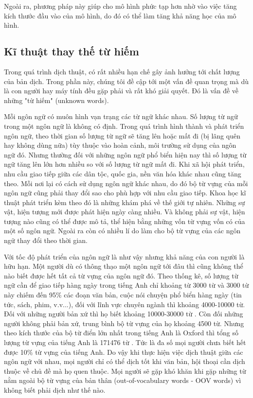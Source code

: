 Ngoài ra, phương pháp này giúp cho mô hình phức tạp hơn nhờ vào việc tăng kích thước đầu vào của mô hình, do đó có thể làm tăng khả năng học của mô hình.

\subsection{Kĩ thuật thay thế từ hiếm}
Trong quá trình dịch thuật, có rất nhiều hạn chế gây ảnh hưởng tới chất lượng của bản dịch. Trong phần này, chúng tôi đề cập tới một vấn đề quan trọng mà dù là con người hay máy tính đều gặp phải và rất khó giải quyết. Đó là vấn đề về những "từ hiếm" (unknown words). 

Mỗi ngôn ngữ có muôn hình vạn trạng các từ ngữ khác nhau. Số lượng từ ngữ trong một ngôn ngữ là không có định. Trong quá trình hình thành và phát triển ngôn ngữ, theo thời gian số lượng từ ngữ sẽ tăng lên hoặc mất đi (bị lãng quên hay không dùng nữa) tùy thuộc vào hoàn cảnh, môi trường sử dụng của ngôn ngữ đó. Nhưng thường đối với những ngôn ngữ phổ biển hiện nay thì số lượng từ ngữ tăng lên lớn hơn nhiều so với số lượng từ ngữ mất đi. Khi xã hội phát triển, nhu cầu giao tiếp giữa các dân tộc, quốc gia, nền văn hóa khác nhau cũng tăng theo. Mỗi nơi lại có cách sử dụng ngôn ngữ khác nhau, do đó bộ từ vựng của mỗi ngôn ngữ cũng phải thay đổi sao cho phù hợp với nhu cầu giao tiếp. Khoa học kĩ thuật phát triển kèm theo đó là những khám phá về thế giới tự nhiên. Những sự vật, hiện tượng mới được phát hiện ngày càng nhiều. Và không phải sự vật, hiện tượng nào cũng có thể được mô tả, thể hiện bằng những vốn từ vựng vốn có của một số ngôn ngữ. Ngoài ra còn có nhiều lí do làm cho bộ từ vựng của các ngôn ngữ thay đổi theo thời gian.

Với tốc độ phát triển của ngôn ngữ là như vậy nhưng khả năng của con người là hữu hạn. Một người dù có thông thạo một ngôn ngữ tới đâu thì cũng không thể nào biết được hết tất cả từ vựng của ngôn ngữ đó. Theo thống kê, số lượng từ ngữ cần để giao tiếp hàng ngày trong tiếng Anh chỉ khoảng từ 3000 từ và 3000 từ này chiếm đến 95\% các đoạn văn bản, cuộc nói chuyện phổ biển hàng ngày (tin tức, sách, phim, v.v...), đối với lĩnh vực chuyên ngành thì khoảng 4000-10000 từ. Đối với những người bản xứ thì họ biết khoảng 10000-30000 từ \cite{VocabReference1ReadingTeacher}. Còn đối những người không phải bản xứ, trung bình bộ từ vựng của họ khoảng 4500 từ. Nhưng theo kích thước của bộ từ điển lớn nhất trong tiếng Anh là Oxford thì tổng số lượng từ vựng của tiếng Anh là 171476 từ \cite{VocabReference2LexicalFacts}. Tức là đa số mọi người chưa biết hết được 10\% từ vựng của tiếng Anh. Do vậy khi thực hiện việc dịch thuật giữa các ngôn ngữ với nhau, mọi người chỉ có thể dịch tốt khi văn bản, hội thoại cần dịch thuộc về chủ đề mà họ quen thuộc. Mọi người sẽ gặp khó khăn khi gặp những từ nằm ngoài bộ từ vựng của bản thân (out-of-vocabulary words - OOV words) vì không biết phải dịch như thế nào.

